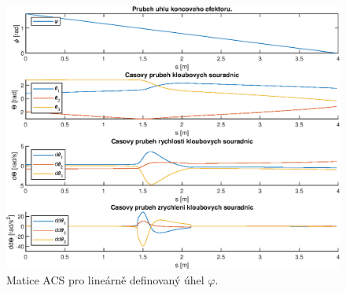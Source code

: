 \documentclass{article}
\begin{document}
					\begin{figure}[H]
						\centering
						\includegraphics[width=\textwidth]{./Graphics/6_Graphics/Kloub_souradnice_lin.eps}
						\caption{Matice ACS pro lineárně definovaný úhel \(\varphi\).} 
					\end{figure}
					\newpage
\end{document}

